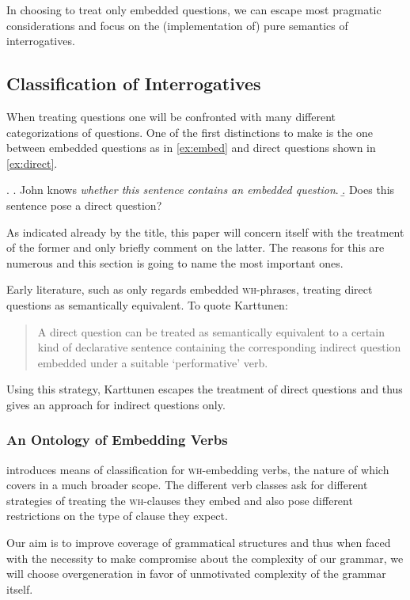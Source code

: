 \documentclass[a4paper]{article}
\newcommand{\term}{\textsf} %
\newcommand{\wh}{\textsc{wh}} %
\begin{document}
In choosing to treat only embedded questions, we can escape most pragmatic
considerations and focus on the (implementation of) pure semantics of
interrogatives.

\subsection{Classification of Interrogatives}

When treating questions one will be confronted with many different
categorizations of questions. One of the first distinctions to make is the one
between \term{embedded questions} as in \ref{ex:embed} and \term{direct
questions} shown in \ref{ex:direct}.

\ex. \a. John knows \emph{whether this sentence contains an embedded
question}.\label{ex:embed}
\b. Does this sentence pose a direct question?\label{ex:direct}

As indicated already by the title, this paper will concern itself with the
treatment of the former and only briefly comment on the latter. The reasons for
this are numerous  %
and this section is going to name the most important ones.

Early literature, such as \cite{karttunen:1977} only regards embedded
\wh-phrases, treating direct questions as semantically equivalent. To quote
Karttunen:

\begin{quote}A direct question can be treated as semantically equivalent to a
certain kind of declarative sentence containing the corresponding indirect
question embedded under  a suitable `performative' verb.\end{quote}

Using this strategy, Karttunen escapes the treatment of direct  questions and
thus gives an approach for indirect questions only.

\subsubsection{An Ontology of Embedding Verbs}

\cite{karttunen:1977} introduces means of classification for \wh-embedding
verbs, the nature of which \cite{lahiri:diss} covers in a much broader scope.
The different verb classes ask for different strategies of treating the
\wh-clauses they embed and also pose different restrictions on the type of
clause they expect.

Our aim is to improve coverage of grammatical structures and thus when faced
with the necessity to make compromise about the complexity of our grammar, we
will choose overgeneration in favor of unmotivated complexity of the grammar
itself.
\end{document}
